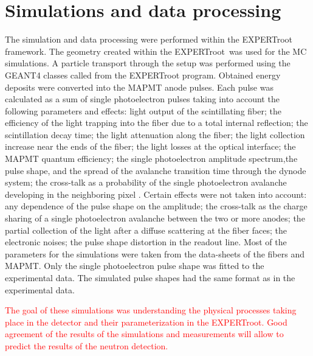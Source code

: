 \documentclass{webofc}
\newcommand{\er}{\textmd{EXPERTroot}}
\newcommand{\red}[1]{\textcolor{red}{#1}}
\begin{document}
\section{Simulations and data processing}

The simulation and data processing were performed within the \er\, framework.
The geometry created within the \er\ was used for the MC simulations.
A particle transport through the setup was performed using the GEANT4 \cite{geant4} classes called from the EXPERTroot program. Obtained energy deposits were converted into the MAPMT anode pulses.
Each pulse was calculated as a sum of single photoelectron pulses taking into account the following parameters and effects: light output of the scintillating fiber; the efficiency of the light trapping into the fiber due to a total internal reflection; the scintillation decay time; the light attenuation along the fiber; the light collection increase near the ends of the fiber; the light losses at the optical interface; the MAPMT quantum efficiency; the single photoelectron amplitude spectrum,the  pulse shape, and the spread of the avalanche transition time through the dynode system; the cross-talk as a probability of the single photoelectron avalanche developing in the neighboring pixel \cite{vitalik}.
Certain effects were not taken into account: any dependence of the pulse shape on the amplitude; the cross-talk as the charge sharing of a single photoelectron avalanche between the two or more anodes; the partial collection of the light after a diffuse scattering at the fiber faces; the electronic noises; the pulse shape distortion in the readout line. Most of the parameters for the simulations were taken from the data-sheets of the fibers and MAPMT. Only the single photoelectron pulse shape was fitted to the experimental data. The simulated pulse shapes had the same format as in the experimental data.

\red{The goal of these simulations was understanding the physical processes taking place in the detector and their parameterization in the \er. Good agreement of the results of the simulations and measurements will allow to predict the results of the neutron detection.}
\end{document}
